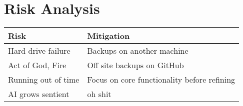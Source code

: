 \section{Risk Analysis}

\begin{center}
    \begin{tabular}{l l}
    \toprule
    Risk                & Mitigation                                    \\
    \midrule
    Hard drive failure  & Backups on another machine                    \\ \addlinespace
    Act of God, Fire    & Off site backups on GitHub                    \\ \addlinespace
    Running out of time & Focus on core functionality before refining   \\ \addlinespace
    AI grows sentient   & oh shit                                       \\
    \bottomrule
    \end{tabular}
\end{center}
